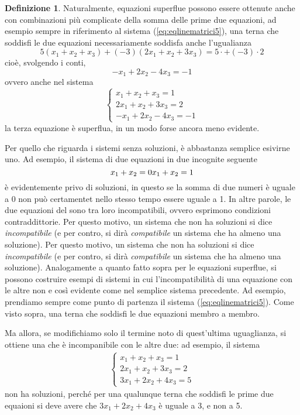 \documentclass{book}
\theoremstyle{definition}
\newtheorem{defi}{Definizione}[section]
\theoremstyle{plain}
\begin{document}
\begin{defi}
  Naturalmente, equazioni superflue possono essere ottenute anche con
  combinazioni più complicate della somma delle prime due equazioni, ad
  esempio sempre in riferimento al sistema (\ref{eq:eqlinematrici5}), una
  terna che soddisfi le due equazioni necessariamente soddisfa anche
  l'ugualianza
  \begin{equation}
    \label{eq:eqlinematrici7}
    5(x_1+x_2+x_3)+(-3)(2x_1+x_2+3x_3)=5\cdot +(-3)\cdot 2
  \end{equation}
  cioè, svolgendo i conti,
  \begin{equation*}
    -x_1+2x_2-4x_3=-1
  \end{equation*}
  ovvero anche nel sistema
  \begin{equation}
    \label{eq:eqlinematrici8}
    \begin{cases}
      x_1+x_2+x_3=1\\
      2x_1+x_2+3x_3=2\\
      -x_1+2x_2-4x_3=-1
    \end{cases}
  \end{equation}
  la terza equazione è superflua, in un modo forse ancora meno evidente.

  Per quello che riguarda i sistemi senza soluzioni, è abbastanza semplice
  esivirne uno. Ad esempio, il sistema di due equazioni in due incognite
  seguente
  \begin{equation*}
    x_1+x_2=0\\
    x_1+x_2=1
  \end{equation*}
  è evidentemente privo di soluzioni, in questo se la somma di due numeri
  è uguale a 0 non può certamentet nello stesso tempo essere uguale a 1.
  In altre parole, le due equazioni del sono tra loro incompatibili,
  ovvero esprimono condizioni contraddittorie.
  Per questo motivo, un sistema che non ha soluzioni si dice
  \textit{incompatibile} (e per contro, si dirà \textit{compatibile} un
  sistema che ha almeno una soluzione).
  Per questo motivo, un sistema che non ha soluzioni si dice
  \textit{incompatibile} (e per contro, si dirà \textit{compatibile} un
  sistema che ha almeno una soluzione).
  Analogamente a quanto fatto sopra per le equazioni superflue, si possono
  costruire esempi di sistemi in cui l'incompatibilità di una equazione
  con le altre non e così evidente come nel semplice sistema precedente.
  Ad esempio, prendiamo sempre come punto di partenza il sistema
  (\ref{eq:eqlinematrici5}). Come visto sopra, una terna che soddisfi le
  due equazioni membro a membro.

  Ma allora, se modifichiamo solo il termine noto di quest'ultima
  uguaglianza, si ottiene una che è incompanibile con le altre due:
  ad esempio, il sistema
  \begin{eqnarray}
    \label{eq:eqlinematrici9}
    \begin{cases}
      x_1+x_2+x_3=1\\
      2x_1+x_2+3x_3=2\\
      3x_1+2x_2+4x_3=5
    \end{cases}
  \end{eqnarray}
  non ha soluzioni, perché per una qualunque terna che soddisfi le prime
  due equaioni si deve avere che $3x_1+2x_2+4x_3$ è uguale a 3, e non a 5.
\end{defi}
\end{document}
